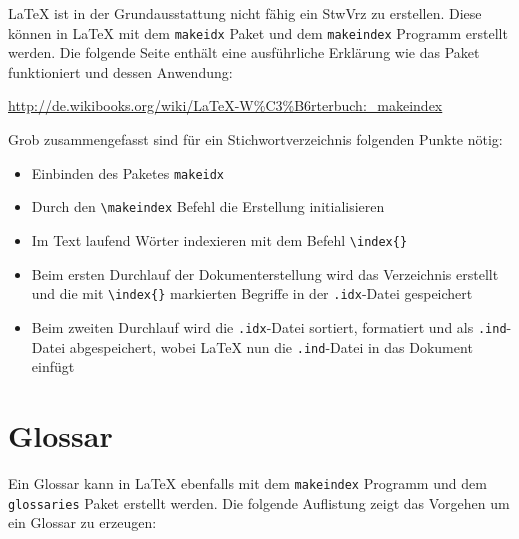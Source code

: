 \LaTeX{} ist in der Grundausstattung nicht fähig ein \gls{StwVrz}  zu erstellen. Diese können in \LaTeX{} mit dem \texttt{makeidx} Paket und dem \texttt{makeindex} Programm erstellt werden. Die folgende Seite enthält eine ausführliche Erklärung wie das Paket funktioniert und dessen Anwendung:

\begin{center}
	\url{http://de.wikibooks.org/wiki/LaTeX-W%C3%B6rterbuch:_makeindex}
\end{center}

Grob zusammengefasst sind für ein Stichwortverzeichnis folgenden Punkte nötig:

\begin{itemize}
	\item Einbinden des Paketes \texttt{makeidx}
	\item Durch den \texttt{\textbackslash makeindex} Befehl die Erstellung initialisieren
	\item Im Text laufend Wörter indexieren mit dem Befehl \texttt{\textbackslash index\{\}}
	\item Beim ersten Durchlauf der Dokumenterstellung wird das Verzeichnis erstellt und die mit \texttt{\textbackslash index\{\}} markierten Begriffe in der \texttt{.idx}-Datei gespeichert
	\item Beim zweiten Durchlauf wird die \texttt{.idx}-Datei sortiert, formatiert und als \texttt{.ind}-Datei abgespeichert, wobei \LaTeX{} nun die \texttt{.ind}-Datei in das Dokument einfügt
\end{itemize}

\section{Glossar}
\label{sec:anleitungen_glossar}

Ein Glossar kann in \LaTeX{} ebenfalls mit dem \texttt{makeindex} Programm und dem \texttt{glossaries} Paket erstellt werden. Die folgende Auflistung zeigt das Vorgehen um ein Glossar zu erzeugen:

